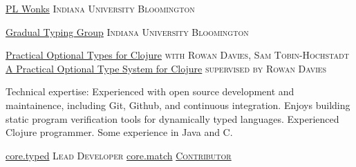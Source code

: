 \documentclass[10pt,a4paper]{article}
\begin{document}

\headedsection
  {\href{http://wonks.github.io/}{PL Wonks}}
  {\textsc{Indiana University Bloomington}} {%
}

\headedsection
  {\href{http://prl.ccs.neu.edu/gtp/index.html}{Gradual Typing Group}}
  {\textsc{Indiana University Bloomington}} {%
}


\headedsection
  {\href{http://frenchy64.github.io/papers/esop16-short.pdf}{Practical Optional Types for Clojure}}
  {\textsc{with Rowan Davies, Sam Tobin-Hochstadt}} {%
    {}
}
\headedsection
  {\href{https://s3.amazonaws.com/github/downloads/frenchy64/papers/ambrose-honours.pdf}{A Practical Optional Type System for Clojure}}
  {\textsc{supervised by Rowan Davies}} {%
    {}
}

\spacedhrule{1.6em}{-0.4em}


\inlineheadsection  %
  {Technical expertise:}
  {Experienced with open source development and maintainence, 
    including Git, Github, and continuous integration.
    Enjoys building static program verification tools for dynamically typed languages.
    Experienced Clojure programmer.
    Some experience in Java and C.
  }

%



\headedsection
  {\href{https://github.com/clojure/core.typed}{core.typed}}
  {\textsc{Lead Developer}} {%
    {
    }
}
\headedsection
  {\href{https://github.com/clojure/core.match}{core.match}}
  {\href{https://github.com/clojure/core.match/commits?author=frenchy64}{\textsc{Contributor}}} {%
    {
    }
}
\end{document}

